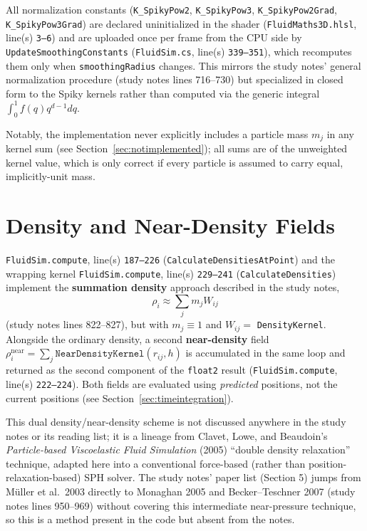 \documentclass[11pt]{article}
\newcommand{\loc}[2]{\texttt{#1}, line(s) \texttt{#2}}
\begin{document}
All normalization constants (\texttt{K\_SpikyPow2}, \texttt{K\_SpikyPow3},
\texttt{K\_SpikyPow2Grad}, \texttt{K\_SpikyPow3Grad}) are declared
uninitialized in the shader (\loc{FluidMaths3D.hlsl}{3--6}) and are uploaded
once per frame from the CPU side by \texttt{UpdateSmoothingConstants}
(\loc{FluidSim.cs}{339--351}), which recomputes them only when
\texttt{smoothingRadius} changes. This mirrors the study notes' general
normalization procedure (study notes lines 716--730) but specialized
in closed form to the Spiky kernels rather than computed via the generic
integral $\int_0^1 f(q)q^{d-1}dq$.

Notably, the implementation never explicitly includes a particle mass $m_j$
in any kernel sum (see Section~\ref{sec:notimplemented}); all sums are of the
unweighted kernel value, which is only correct if every particle is assumed
to carry equal, implicitly-unit mass.

\section{Density and Near-Density Fields}

\loc{FluidSim.compute}{187--226} (\texttt{CalculateDensitiesAtPoint}) and
the wrapping kernel \loc{FluidSim.compute}{229--241}
(\texttt{CalculateDensities}) implement the \textbf{summation density}
approach described in the study notes,
\begin{equation*}
    \rho_i \approx \sum_j m_j W_{ij}
\end{equation*}
(study notes lines 822--827), but with $m_j\equiv1$ and $W_{ij}=$
\texttt{DensityKernel}. Alongside the ordinary density, a second
\textbf{near-density} field $\rho_i^{\text{near}}=\sum_j
\texttt{NearDensityKernel}(r_{ij},h)$ is accumulated in the same loop and
returned as the second component of the \texttt{float2} result
(\loc{FluidSim.compute}{222--224}). Both fields are evaluated using
\emph{predicted} positions, not the current positions (see
Section~\ref{sec:timeintegration}).

This dual density/near-density scheme is not discussed anywhere in the study
notes or its reading list; it is a lineage from Clavet, Lowe, and Beaudoin's
\emph{Particle-based Viscoelastic Fluid Simulation} (2005)
``double density relaxation'' technique, adapted here into a conventional
force-based (rather than position-relaxation-based) SPH solver. The study
notes' paper list (Section 5) jumps from M\"uller et al.\ 2003 directly to
Monaghan 2005 and Becker--Teschner 2007 (study notes lines 950--969) without
covering this intermediate near-pressure technique, so this is a method
present in the code but absent from the notes.
\end{document}
